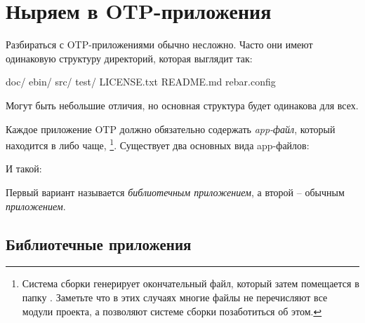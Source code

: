 \documentclass[11pt, oneside]{book}   	%
\begin{document}
\section{Ныряем в OTP-приложения}
\label{sec:dive-otp-applications}

Разбираться с OTP-приложениями обычно несложно. Часто они имеют одинаковую структуру директорий, которая выглядит так:

\begin{VerbatimRaw}
doc/
ebin/
src/
test/
LICENSE.txt
README.md
rebar.config
\end{VerbatimRaw}

Могут быть небольшие отличия, но основная структура будет одинакова для всех.

Каждое приложение OTP должно обязательно содержать \emph{app-файл}, который находится в  либо чаще, \footnote{Система сборки генерирует окончательный файл, который затем помещается в папку . Заметьте что в этих случаях многие файлы   не перечисляют все модули проекта, а позволяют системе сборки позаботиться об этом.}. Существует два основных вида app-файлов:


И такой:


Первый вариант называется \emph{библиотечным приложением}, а второй -- обычным \emph{приложением}.


\subsection{Библиотечные приложения}
\label{subsec:dive-library-applications}
\end{document}
